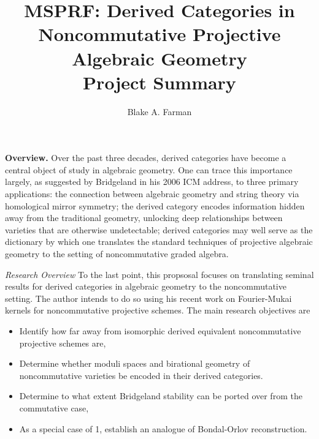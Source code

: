 \documentclass[11pt]{article}
\title{MSPRF: Derived Categories in Noncommutative Projective Algebraic Geometry\\\small{Project Summary}}
\author{Blake A. Farman}
\date{}
\begin{document}
\maketitle

\noindent\textbf{Overview.}
Over the past three decades, derived categories have become a central object of study in algebraic geometry.
One can trace this importance largely, as suggested by Bridgeland in his 2006 ICM address, to three primary applications: the connection between algebraic geometry and string theory via homological mirror symmetry; the derived category encodes information hidden away from the traditional geometry, unlocking deep relationships between varieties that are otherwise undetectable;
derived categories may well serve as the dictionary by which one translates the standard techniques of projective algebraic geometry to the setting of noncommutative graded algebra.

\noindent\emph{Research Overview}
To the last point, this propsosal focuses on translating seminal results for derived categories in algebraic geometry to the noncommutative setting.
The author intends to do so using his recent work on Fourier-Mukai kernels for noncommutative projective schemes.
The main research objectives are
\begin{itemize}

\item
  Identify how far away from isomorphic derived equivalent noncommutative projective schemes are,
\item
  Determine whether moduli spaces and birational geometry of noncommutative varieties be encoded in their derived categories.
\item
  Determine to what extent Bridgeland stability can be ported over from the commutative case,
\item
  As a special case of 1, establish an analogue of Bondal-Orlov reconstruction.
\end{itemize}
\end{document}
